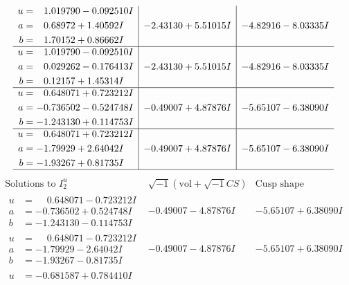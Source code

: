 \documentclass[1p]{elsarticle_modified}
\theoremstyle{definition}
\newcommand{\I}{\sqrt{-1}}
\begin{document}
$$\begin{array}{c|c|c}
\begin{aligned}
u &= \phantom{-}1.019790 - 0.092510 I \\
a &= \phantom{-}0.68972 + 1.40592 I \\
b &= \phantom{-}1.70152 + 0.86662 I\end{aligned}
 & -2.43130 + 5.51015 I & -4.82916 - 8.03335 I \\ \hline\begin{aligned}
u &= \phantom{-}1.019790 - 0.092510 I \\
a &= \phantom{-}0.029262 - 0.176413 I \\
b &= \phantom{-}0.12157 + 1.45314 I\end{aligned}
 & -2.43130 + 5.51015 I & -4.82916 - 8.03335 I \\ \hline\begin{aligned}
u &= \phantom{-}0.648071 + 0.723212 I \\
a &= -0.736502 - 0.524748 I \\
b &= -1.243130 + 0.114753 I\end{aligned}
 & -0.49007 + 4.87876 I & -5.65107 - 6.38090 I \\ \hline\begin{aligned}
u &= \phantom{-}0.648071 + 0.723212 I \\
a &= -1.79929 + 2.64042 I \\
b &= -1.93267 + 0.81735 I\end{aligned}
 & -0.49007 + 4.87876 I & -5.65107 - 6.38090 I\\
 \hline 
 \end{array}$$\newpage$$\begin{array}{c|c|c}  
\text{Solutions to }I^u_{2}& \I (\text{vol} + \sqrt{-1}CS) & \text{Cusp shape}\\
 \hline 
\begin{aligned}
u &= \phantom{-}0.648071 - 0.723212 I \\
a &= -0.736502 + 0.524748 I \\
b &= -1.243130 - 0.114753 I\end{aligned}
 & -0.49007 - 4.87876 I & -5.65107 + 6.38090 I \\ \hline\begin{aligned}
u &= \phantom{-}0.648071 - 0.723212 I \\
a &= -1.79929 - 2.64042 I \\
b &= -1.93267 - 0.81735 I\end{aligned}
 & -0.49007 - 4.87876 I & -5.65107 + 6.38090 I \\ \hline\begin{aligned}
u &= -0.681587 + 0.784410 I \\

\end{aligned}
\end{array}$$
\end{document}
